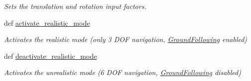 \begin{DoxyCompactItemize}
\begin{DoxyCompactList}\small\item\em \-Sets the translation and rotation input factors. \end{DoxyCompactList}\item 
def \hyperlink{classlib_1_1InputMapping_1_1InputMapping_af79fe48135a7975ea035dee40787a580}{activate\-\_\-realistic\-\_\-mode}
\begin{DoxyCompactList}\small\item\em \-Activates the realistic mode (only 3 \-D\-O\-F navigation, \hyperlink{namespacelib_1_1GroundFollowing}{\-Ground\-Following} enabled) \end{DoxyCompactList}\item 
def \hyperlink{classlib_1_1InputMapping_1_1InputMapping_a150b816c011d17e3e7f041217784941a}{deactivate\-\_\-realistic\-\_\-mode}
\begin{DoxyCompactList}\small\item\em \-Activates the unrealistic mode (6 \-D\-O\-F navigation, \hyperlink{namespacelib_1_1GroundFollowing}{\-Ground\-Following} disabled) \end{DoxyCompactList}\end{DoxyCompactItemize}
